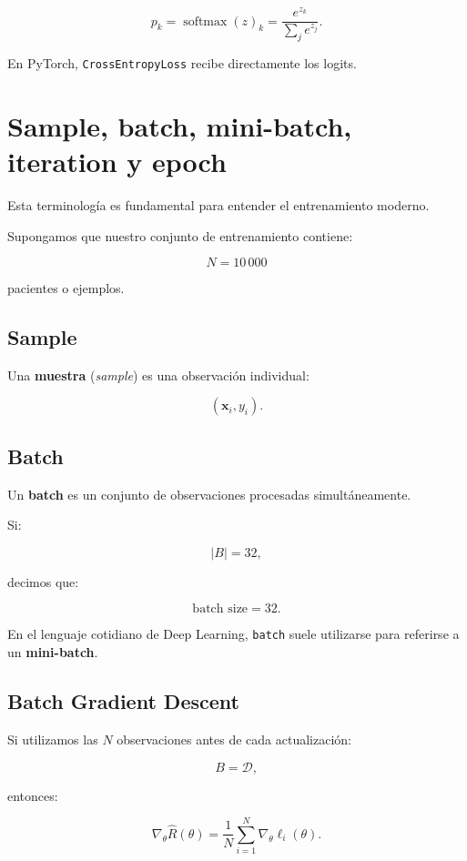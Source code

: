 \documentclass[
  letterpaper,
  DIV=11,
  numbers=noendperiod]{scrartcl}
\begin{document}
\[
p_k
=
\operatorname{softmax}(z)_k
=
\frac{e^{z_k}}
{\sum_j e^{z_j}}.
\]

En PyTorch, \texttt{CrossEntropyLoss} recibe directamente los logits.

\section{Sample, batch, mini-batch, iteration y
epoch}\label{sample-batch-mini-batch-iteration-y-epoch}

Esta terminología es fundamental para entender el entrenamiento moderno.

Supongamos que nuestro conjunto de entrenamiento contiene:

\[
N=10\,000
\]

pacientes o ejemplos.

\subsection{Sample}\label{sample}

Una \textbf{muestra} (\emph{sample}) es una observación individual:

\[
(\mathbf x_i,y_i).
\]

\subsection{Batch}\label{batch}

Un \textbf{batch} es un conjunto de observaciones procesadas
simultáneamente.

Si:

\[
|B|=32,
\]

decimos que:

\[
\text{batch size}=32.
\]

En el lenguaje cotidiano de Deep Learning, \texttt{batch} suele
utilizarse para referirse a un \textbf{mini-batch}.

\subsection{Batch Gradient Descent}\label{batch-gradient-descent}

Si utilizamos las \(N\) observaciones antes de cada actualización:

\[
B=\mathcal D,
\]

entonces:

\[
\nabla_\theta\widehat R(\theta)
=
\frac1N
\sum_{i=1}^{N}
\nabla_\theta\ell_i(\theta).
\]
\end{document}
